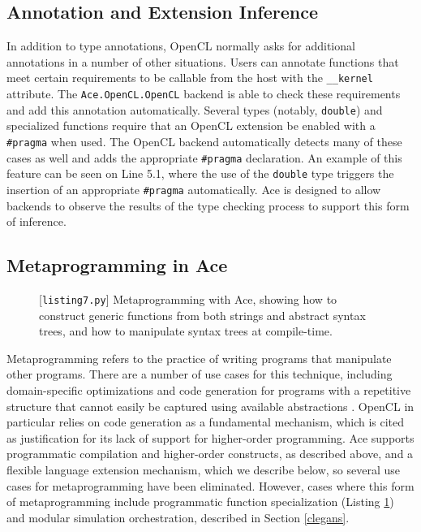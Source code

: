 \documentclass[10pt]{sigplanconf}
\begin{document}
\subsection{Annotation and Extension Inference}
In addition to type annotations, OpenCL normally asks for additional annotations in a number of other situations.  Users can annotate functions that meet certain requirements to be callable from the host with the \verb|__kernel| attribute. The \verb|Ace.OpenCL.OpenCL| backend is able to check these requirements and add this annotation automatically. Several types (notably, \verb|double|) and specialized functions require that an OpenCL extension be enabled with a \verb|#pragma| when used. The OpenCL backend automatically detects many of these cases as well and adds the appropriate \verb|#pragma| declaration. An example of this feature can be seen on Line 5.1, where the use of the \verb|double| type triggers the insertion of an appropriate \verb|#pragma| automatically. Ace is designed to allow backends to observe the results of the type checking process to support this form of inference.

\subsection{Metaprogramming in Ace}
\begin{figure}

\caption{[\texttt{listing7.py}] Metaprogramming with Ace, showing how to construct generic functions from both strings and abstract syntax trees, and how to manipulate syntax trees at compile-time.}
\label{metaprogramming}
\end{figure}
Metaprogramming refers to the practice of writing programs that manipulate other programs. There are a number of use cases for this technique, including domain-specific optimizations and code generation for programs with a repetitive structure that cannot easily be captured using available abstractions \cite{pyopencl}. OpenCL in particular relies on code generation as a fundamental mechanism, which is cited as justification for its lack of support for higher-order programming. Ace supports programmatic compilation and higher-order constructs, as described above, and a flexible language extension mechanism, which we describe below, so several use cases for metaprogramming have been eliminated. However, cases where this form of metaprogramming include programmatic function specialization (Listing \ref{metaprogramming}) and modular simulation orchestration, described in Section \ref{clegans}.
\end{document}
